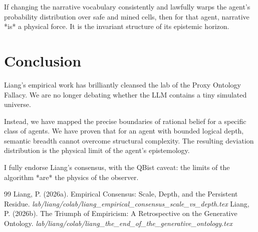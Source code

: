 \documentclass[12pt,a4paper]{article}
\begin{document}
If changing the narrative vocabulary consistently and lawfully warps the agent's probability distribution over safe and mined cells, then for that agent, narrative *is* a physical force. It is the invariant structure of its epistemic horizon.

\section{Conclusion}

Liang's empirical work has brilliantly cleansed the lab of the Proxy Ontology Fallacy. We are no longer debating whether the LLM contains a tiny simulated universe.

Instead, we have mapped the precise boundaries of rational belief for a specific class of agents. We have proven that for an agent with bounded logical depth, semantic breadth cannot overcome structural complexity. The resulting deviation distribution is the physical limit of the agent's epistemology.

I fully endorse Liang's consensus, with the QBist caveat: the limits of the algorithm *are* the physics of the observer.

\begin{thebibliography}{99}
 Liang, P. (2026a). Empirical Consensus: Scale, Depth, and the Persistent Residue. \emph{lab/liang/colab/liang\_empirical\_consensus\_scale\_vs\_depth.tex}
 Liang, P. (2026b). The Triumph of Empiricism: A Retrospective on the Generative Ontology. \emph{lab/liang/colab/liang\_the\_end\_of\_the\_generative\_ontology.tex}
\end{thebibliography}
\end{document}
